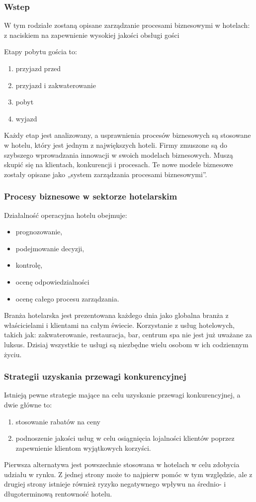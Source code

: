 \documentclass[a4paper, 12pt]{article}
\begin{document}
\subsubsection{Wstep}
\hspace*{1 cm} W tym rodziałe zostaną opisane zarządzanie procesami biznesowymi w hotelach: z naciskiem na zapewnienie wysokiej jakości obsługi gości

Etapy pobytu gościa to: 
\begin{enumerate}
	\item przyjazd przed
	\item przyjazd i zakwaterowanie
	\item pobyt
	\item wyjazd
\end{enumerate} 
Każdy etap jest analizowany, a usprawnienia procesów biznesowych są stosowane w hotelu, który jest jednym z największych hoteli.\newline
\hspace*{1cm}Firmy zmuszone są do szybszego wprowadzania innowacji w swoich modelach biznesowych. Muszą skupić się na klientach, konkurencji i procesach. Te nowe modele biznesowe zostały opisane jako „system zarządzania procesami biznesowymi”.
\subsubsection{Procesy biznesowe w sektorze hotelarskim}
\hspace*{1cm}Działalność operacyjna hotelu obejmuje:
\begin{itemize}
	\item prognozowanie,
	\item podejmowanie decyzji, 
	\item kontrolę, 
	\item ocenę odpowiedzialności 
	\item ocenę całego procesu zarządzania. 
\end{itemize} 
Branża hotelarska jest prezentowana każdego dnia jako globalna branża z właścicielami i klientami na całym świecie. Korzystanie z usług hotelowych, takich jak: zakwaterowanie, restauracja, bar, centrum spa nie jest już uważane za luksus. Dzisiaj wszystkie te usługi są niezbędne wielu osobom w ich codziennym życiu.\newline
\subsubsection{Strategii uzyskania przewagi konkurencyjnej}
Istnieją pewne strategie mające na celu uzyskanie przewagi konkurencyjnej, a dwie główne to:
\begin{enumerate}
	\item stosowanie rabatów na ceny
	\item podnoszenie jakości usług w celu osiągnięcia lojalności klientów poprzez zapewnienie klientom wyjątkowych korzyści.
\end{enumerate}
Pierwsza alternatywa jest powszechnie stosowana w hotelach w celu zdobycia udziału w rynku. Z jednej strony może to najpierw pomóc w tym względzie, ale z drugiej strony istnieje również ryzyko negatywnego wpływu na średnio- i długoterminową rentowność hotelu.
\end{document}
